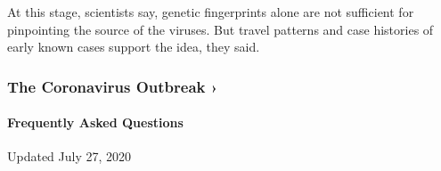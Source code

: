 At this stage, scientists say, genetic fingerprints alone are not
sufficient for pinpointing the source of the viruses. But travel
patterns and case histories of early known cases support the idea, they
said.

\href{https://www.nytimes.com/news-event/coronavirus?action=click\&pgtype=Article\&state=default\&region=MAIN_CONTENT_3\&context=storylines_faq}{}

\hypertarget{the-coronavirus-outbreak-}{%
\subsubsection{The Coronavirus Outbreak
›}\label{the-coronavirus-outbreak-}}

\hypertarget{frequently-asked-questions}{%
\paragraph{Frequently Asked
Questions}\label{frequently-asked-questions}}

Updated July 27, 2020

